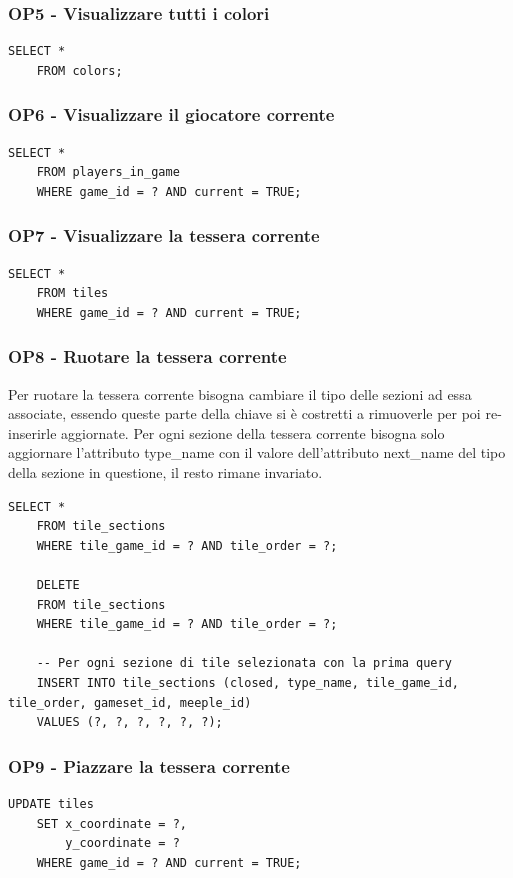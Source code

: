 \subsubsection*{OP5 - Visualizzare tutti i colori}
\begin{lstlisting}[style=sql]
    SELECT *
    FROM colors;
\end{lstlisting}

\subsubsection*{OP6 - Visualizzare il giocatore corrente}
\begin{lstlisting}[style=sql]
    SELECT *
    FROM players_in_game
    WHERE game_id = ? AND current = TRUE;
\end{lstlisting}

\subsubsection*{OP7 - Visualizzare la tessera corrente}
\begin{lstlisting}[style=sql]
    SELECT *
    FROM tiles
    WHERE game_id = ? AND current = TRUE;
\end{lstlisting}

\subsubsection*{OP8 - Ruotare la tessera corrente}
Per ruotare la tessera corrente bisogna cambiare il tipo delle sezioni ad essa associate, essendo queste parte della chiave si è costretti a rimuoverle per poi re-inserirle aggiornate. Per ogni sezione della tessera corrente bisogna solo aggiornare l'attributo type\_name con il valore dell'attributo next\_name del tipo della sezione in questione, il resto rimane invariato.
\medskip

\begin{lstlisting}[style=sql]
    SELECT *
    FROM tile_sections
    WHERE tile_game_id = ? AND tile_order = ?;

    DELETE
    FROM tile_sections
    WHERE tile_game_id = ? AND tile_order = ?;

    -- Per ogni sezione di tile selezionata con la prima query
    INSERT INTO tile_sections (closed, type_name, tile_game_id, tile_order, gameset_id, meeple_id)
    VALUES (?, ?, ?, ?, ?, ?);
\end{lstlisting}


\subsubsection*{OP9 - Piazzare la tessera corrente}
\begin{lstlisting}[style=sql]
    UPDATE tiles
    SET x_coordinate = ?,
        y_coordinate = ?
    WHERE game_id = ? AND current = TRUE;
\end{lstlisting}

